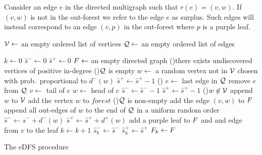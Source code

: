 Consider an edge $e$ in the directed multigraph such that $r(e) = (v, w)$. If $(v, w)$ is not in the out-forest we refer to the edge $e$ as surplus. Such edges will instead correspond to an edge $(v, p)$ in the out-forest where $p$ is a purple leaf.

\begin{algorithm}[htbp]
    \SetAlgoLined
    $\mathcal V \leftarrow$ an empty ordered list of vertices \;
    $\mathcal Q \leftarrow$ an empty ordered list of edges \;

    $k \leftarrow 0$  \;
    $\hat{s}^- \leftarrow 0$ \;
    $\hat{s}^+ \leftarrow 0$  \;
    $F \leftarrow$ an empty directed graph \;
    \While(){there exists undiscovered vertices of positive in-degree}{
        \eIf(){$\mathcal Q$ is empty}{
            $w \leftarrow$ a random vertex not in $\mathcal V$ chosen with prob.\ proportional to $d^-(w)$ \;
            $\hat{s}^+ \leftarrow \hat{s}^+ - 1$  \;
        }(){
            $e \leftarrow$ last edge in $\mathcal Q$ \;
            remove $e$ from $\mathcal Q$ \;
            $v \leftarrow$ tail of $e$\;
            $w \leftarrow$ head of $e$ \;
            $\hat{s}^- \leftarrow \hat{s}^- - 1$  \;
            $\hat{s}^+ \leftarrow \hat{s}^+ - 1$  \;
        }
        \eIf(){$w \not \in \mathcal V$}{
            append $w$ to $\mathcal V$ \; 
            add the vertex $w$ to $forest$ \;
            \If(){$\mathcal Q$ is non-empty}{
                add the edge $(v, w)$ to $F$\;
            }
            append all out-edges of $w$ to the end of $\mathcal Q$ in a uniform random order \;
            $\hat{s}^- \leftarrow \hat{s}^- + d^-(w)$  \;
            $\hat{s}^+ \leftarrow \hat{s}^+ + d^+(w)$ \;
        }{
            add a purple leaf to $F$ and and edge from $v$ to the leaf  \;
        }
        $k \leftarrow k + 1$ \;
        $\hat{s}^-_k \leftarrow \hat{s}^-$ \;
        $\hat{s}^+_k \leftarrow \hat{s}^+$ \;
        $F_k \leftarrow F$ \;
    }
    \caption{The eDFS procedure \label{alg:edfs}}
\end{algorithm}

